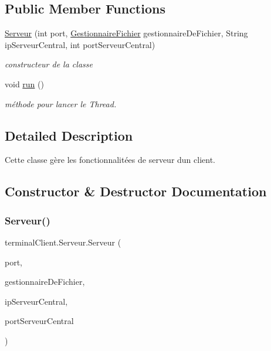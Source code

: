 \subsection*{Public Member Functions}
\begin{DoxyCompactItemize}
\item 
\hyperlink{classterminalClient_1_1Serveur_afb46fedaf8b4dd05eac7f7931a8587dd}{Serveur} (int port, \hyperlink{classterminalClient_1_1GestionnaireFichier}{Gestionnaire\+Fichier} gestionnaire\+De\+Fichier, String ip\+Serveur\+Central, int port\+Serveur\+Central)
\begin{DoxyCompactList}\small\item\em constructeur de la classe \end{DoxyCompactList}\item 
void \hyperlink{classterminalClient_1_1Serveur_a3231a51ed25972d4b52e7aed302efea5}{run} ()
\begin{DoxyCompactList}\small\item\em méthode pour lancer le Thread. \end{DoxyCompactList}\end{DoxyCompactItemize}


\subsection{Detailed Description}
Cette classe gère les fonctionnalitées de serveur d\textquotesingle{}un client. 

\subsection{Constructor \& Destructor Documentation}
\mbox{\label{classterminalClient_1_1Serveur_afb46fedaf8b4dd05eac7f7931a8587dd}} 
\subsubsection{\texorpdfstring{Serveur()}{Serveur()}}
{\footnotesize\ttfamily terminal\+Client.\+Serveur.\+Serveur (\begin{DoxyParamCaption}\item[{int}]{port,  }\item[{\hyperlink{classterminalClient_1_1GestionnaireFichier}{Gestionnaire\+Fichier}}]{gestionnaire\+De\+Fichier,  }\item[{String}]{ip\+Serveur\+Central,  }\item[{int}]{port\+Serveur\+Central }\end{DoxyParamCaption})\hspace{0.3cm}{\ttfamily [inline]}}



